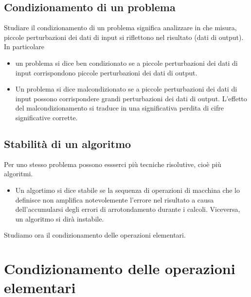 \documentclass[12pt]{report}
\begin{document}
\subsection{Condizionamento di un problema}
Studiare il condizionamento di un problema significa analizzare in che misura, piccole perturbazioni dei dati di input si riflettono nel risultato (dati di output). In particolare
\begin{itemize}
	\item un problema si dice ben condizionato se a piccole perturbazioni dei dati di input corrispondono piccole perturbazioni dei dati di output.
	\item Un problema si dice malcondizionato se a piccole perturbazioni dei dati di input possono corrispondere grandi perturbazioni dei dati di output. L'effetto del malcondizionamento si traduce in una significativa perdita di cifre significative corrette.
\end{itemize}
\subsection{Stabilità di un algoritmo}
	Per uno stesso problema possono essserci più tecniche risolutive, cioè più algoritmi.
	\begin{itemize}
		\item Un algortimo si dice stabile se la sequenza di operazioni di macchina che lo definisce non amplifica notevolemente l'errore nel risultato a causa dell'accumularsi degli errori di arrotondamento durante i calcoli. Viceversa, un algoritmo si dirà instabile.
	\end{itemize}
Studiamo ora il condizionamento delle operazioni elementari.
\section{Condizionamento delle operazioni elementari}
\end{document}
